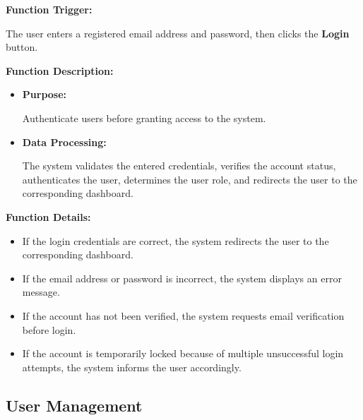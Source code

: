 \textbf{Function Trigger:}

The user enters a registered email address and password, then clicks the \textbf{Login} button.

\vspace{0.3cm}

\textbf{Function Description:}

\begin{itemize}
    \item \textbf{Purpose:}

    Authenticate users before granting access to the system.

    \item \textbf{Data Processing:}

    The system validates the entered credentials, verifies the account status, authenticates the user, determines the user role, and redirects the user to the corresponding dashboard.
\end{itemize}

\vspace{0.3cm}

\textbf{Function Details:}

\begin{itemize}
    \item If the login credentials are correct, the system redirects the user to the corresponding dashboard.

    \item If the email address or password is incorrect, the system displays an error message.

    \item If the account has not been verified, the system requests email verification before login.

    \item If the account is temporarily locked because of multiple unsuccessful login attempts, the system informs the user accordingly.
\end{itemize}



\subsection{User Management}

